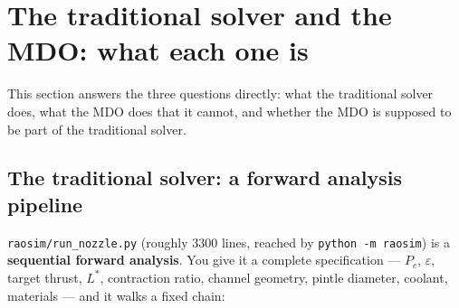 \documentclass[11pt]{article}
\newcommand{\cmd}[1]{\nolinkurl{#1}}
\begin{document}
\section{The traditional solver and the MDO: what each one is}
\label{sec:solver-vs-mdo}

This section answers the three questions directly: what the traditional
solver does, what the MDO does that it cannot, and whether the MDO is
supposed to be part of the traditional solver.

\subsection{The traditional solver: a forward analysis pipeline}

\cmd{raosim/run\_nozzle.py} (roughly 3300 lines, reached by
\cmd{python -m raosim}) is a \textbf{sequential forward analysis}. You give
it a complete specification --- $P_c$, $\varepsilon$, target thrust, $L^*$,
contraction ratio, channel geometry, pintle diameter, coolant, materials ---
and it walks a fixed chain:

\begin{center}
\end{center}
\end{document}

